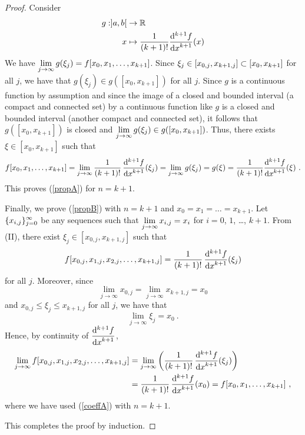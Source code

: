 \begin{proof}
Consider
\begin{align*}
  g: ]a,b[ & \to \mathbb{R} \\
  x & \mapsto \frac{1}{(k+1)!}\displaystyle \frac{\mathrm{d}^{k+1}{f}} {\displaystyle \mathrm{d}{x}^{k+1}}(x)
\end{align*}
We have
$\displaystyle \lim_{j\rightarrow \infty} g(\xi_j) = f[x_0,x_1,\ldots, x_{k+1}] $.
Since $\displaystyle
\xi_j \in [x_{0,j}, x_{k+1,j}] \subset [x_0,x_{k+1}]$ for all
$j$, we have that
$g(\xi_j) \in g([x_0,x_{k+1}])$ for all $j$.
Since $g$ is a continuous function by assumption and since
the image of a closed and bounded interval (a compact and connected
set) by a continuous function like $g$ is a closed and bounded
interval (another compact and connected set), it follows that
$g([x_0,x_{k+1}])$ is closed and
$\displaystyle \lim_{j\rightarrow \infty} g(\xi_j) \in g([x_0,x_{k+1}])$.
Thus, there exists $\xi \in [x_0,x_{k+1}]$
such that
\[
f[x_0,x_1,\ldots,x_{k+1}]
= \lim_{j\rightarrow \infty}
\frac{1}{(k+1)!}\,\displaystyle \frac{\mathrm{d}^{k+1}{f}} {\displaystyle \mathrm{d}{x}^{k+1}}(\xi_j)
= \lim_{j\rightarrow \infty} g(\xi_j) = g(\xi)
= \frac{1}{(k+1)!} \displaystyle \frac{\mathrm{d}^{k+1}{f}} {\displaystyle \mathrm{d}{x}^{k+1}}(\xi) \ .
\]
This proves (\ref{propA}) for $n=k+1$.

Finally, we prove (\ref{propB}) with $n=k+1$ and
$x_0 = x_1 = \ldots = x_{k+1}$.  Let
$\displaystyle \{x_{i,j}\}_{j=0}^\infty$ be
any sequences such that $\displaystyle \lim_{j\to \infty} x_{i,j} = x_i$
for $i=0$, $1$, \ldots, $k+1$.   From (II),
there exist $\xi_j \in [x_{0,j}, x_{k+1,j}]$ such that
\[
f[x_{0,j},x_{1,j},x_{2,j}, \ldots, x_{k+1,j}] =
\frac{1}{(k+1)!}\,\displaystyle \frac{\mathrm{d}^{k+1}{f}} {\displaystyle \mathrm{d}{x}^{k+1}}(\xi_j) 
\]
for all $j$.  Moreover, since
\[
\lim_{j\rightarrow \infty} x_{0,j} =
\lim_{j\rightarrow \infty} x_{k+1,j} = x_0
\]
and $x_{0,j} \leq \xi_j \leq x_{k+1,j}$ for all $j$, we have that
\[
\lim_{j\rightarrow \infty} \xi_j = x_0 \ .
\]
Hence, by continuity of $\displaystyle \displaystyle \frac{\mathrm{d}^{k+1}{f}} {\displaystyle \mathrm{d}{x}^{k+1}}$,
\begin{align*}
\lim_{j\rightarrow \infty}
f[x_{0,j}, x_{1,j}, x_{2,j}, \ldots, x_{k+1,j}]
&= \lim_{j\rightarrow \infty}
\left( \frac{1}{(k+1)!}\,\displaystyle \frac{\mathrm{d}^{k+1}{f}} {\displaystyle \mathrm{d}{x}^{k+1}}(\xi_j) \right) \\
&= \frac{1}{(k+1)!}\,\displaystyle \frac{\mathrm{d}^{k+1}{f}} {\displaystyle \mathrm{d}{x}^{k+1}}(x_0)
= f[x_0,x_1, \ldots, x_{k+1}] \ ,
\end{align*}
where we have used (\ref{coeffA}) with $n=k+1$.

This completes the proof by induction.
\end{proof}


